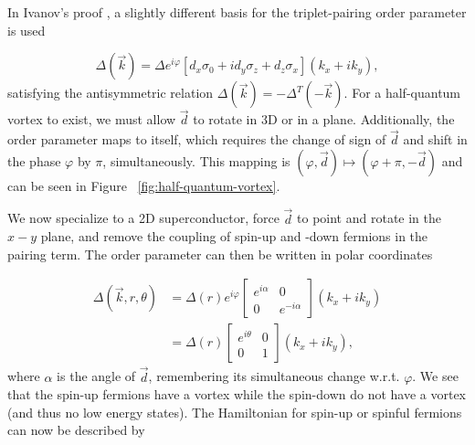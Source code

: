 In Ivanov's proof \cite{ivanovNonAbelianStatisticsHalfQuantum2001}, a slightly different basis for the triplet-pairing order parameter is used

\begin{equation}
  \Delta (\vec{k}) = \Delta e^{i\varphi} \left[ d_x \sigma_0 + i d_y \sigma_z + d_z \sigma_x \right] (k_x + i k_y),
\end{equation}
satisfying the antisymmetric relation $\Delta(\vec{k}) = -\Delta^T (-\vec{k})$.
For a half-quantum vortex to exist, we must allow $\vec{d}$ to rotate in 3D or in a plane.
Additionally, the order parameter maps to itself, which requires the change of sign of $\vec{d}$ and shift in the phase $\varphi$ by $\pi$, simultaneously.
This mapping is
$(\varphi, \vec{d}) \mapsto (\varphi+\pi,-\vec{d})$
and can be seen in Figure ~\ref{fig:half-quantum-vortex}.

We now specialize to a 2D superconductor, force $\vec{d}$ to point and rotate in the $x-y$ plane, and remove the coupling of spin-up and -down fermions in the pairing term.
The order parameter can then be written in polar coordinates

\begin{align}
  \Delta (\vec{k},r,\theta) &= \Delta(r) e^{i\varphi}
  \begin{bmatrix}
    e^{i\alpha} & 0 \\
    0 & e^{-i\alpha}
  \end{bmatrix}
  (k_x + i k_y) \nonumber \\
  &= \Delta(r)
  \begin{bmatrix}
    e^{i\theta} & 0 \\
    0 & 1
  \end{bmatrix}
  (k_x + i k_y),
\end{align}
where $\alpha$ is the angle of $\vec{d}$, remembering its simultaneous change w.r.t. $\varphi$.
We see that the spin-up fermions have a vortex while the spin-down do not have a vortex (and thus no low energy states).
The Hamiltonian for spin-up or spinful fermions can now be described by

